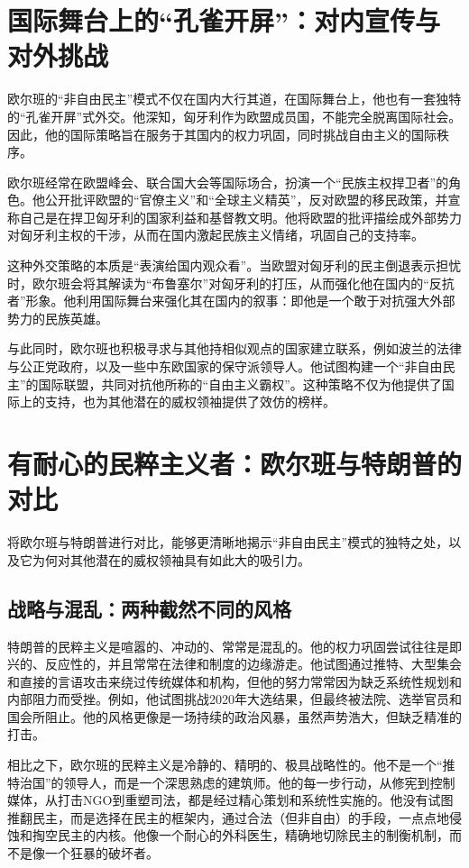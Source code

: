 \section{国际舞台上的“孔雀开屏”：对内宣传与对外挑战}

欧尔班的“非自由民主”模式不仅在国内大行其道，在国际舞台上，他也有一套独特的“孔雀开屏”式外交。他深知，匈牙利作为欧盟成员国，不能完全脱离国际社会。因此，他的国际策略旨在服务于其国内的权力巩固，同时挑战自由主义的国际秩序。

欧尔班经常在欧盟峰会、联合国大会等国际场合，扮演一个“民族主权捍卫者”的角色。他公开批评欧盟的“官僚主义”和“全球主义精英”，反对欧盟的移民政策，并宣称自己是在捍卫匈牙利的国家利益和基督教文明。他将欧盟的批评描绘成外部势力对匈牙利主权的干涉，从而在国内激起民族主义情绪，巩固自己的支持率。

这种外交策略的本质是“表演给国内观众看”。当欧盟对匈牙利的民主倒退表示担忧时，欧尔班会将其解读为“布鲁塞尔”对匈牙利的打压，从而强化他在国内的“反抗者”形象。他利用国际舞台来强化其在国内的叙事：即他是一个敢于对抗强大外部势力的民族英雄。

与此同时，欧尔班也积极寻求与其他持相似观点的国家建立联系，例如波兰的法律与公正党政府，以及一些中东欧国家的保守派领导人。他试图构建一个“非自由民主”的国际联盟，共同对抗他所称的“自由主义霸权”。这种策略不仅为他提供了国际上的支持，也为其他潜在的威权领袖提供了效仿的榜样。

\section{有耐心的民粹主义者：欧尔班与特朗普的对比}

将欧尔班与特朗普进行对比，能够更清晰地揭示“非自由民主”模式的独特之处，以及它为何对其他潜在的威权领袖具有如此大的吸引力。

\subsection{战略与混乱：两种截然不同的风格}

特朗普的民粹主义是喧嚣的、冲动的、常常是混乱的。他的权力巩固尝试往往是即兴的、反应性的，并且常常在法律和制度的边缘游走。他试图通过推特、大型集会和直接的言语攻击来绕过传统媒体和机构，但他的努力常常因为缺乏系统性规划和内部阻力而受挫。例如，他试图挑战2020年大选结果，但最终被法院、选举官员和国会所阻止。他的风格更像是一场持续的政治风暴，虽然声势浩大，但缺乏精准的打击。

相比之下，欧尔班的民粹主义是冷静的、精明的、极具战略性的。他不是一个“推特治国”的领导人，而是一个深思熟虑的建筑师。他的每一步行动，从修宪到控制媒体，从打击NGO到重塑司法，都是经过精心策划和系统性实施的。他没有试图推翻民主，而是选择在民主的框架内，通过合法（但非自由）的手段，一点点地侵蚀和掏空民主的内核。他像一个耐心的外科医生，精确地切除民主的制衡机制，而不是像一个狂暴的破坏者。

